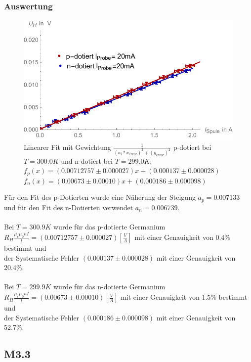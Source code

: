 \subsubsection{Auswertung}
\begin{figure}[H]
	\centering
\includegraphics[width=0.9\linewidth]{IMAGE/M32_Fit.pdf}
	\caption{Linearer Fit mit Gewichtung $\frac{1}{(a_{i}*x_{error})^2+(y_{error})^2}$ p-dotiert bei $T=300.0K$ und n-dotiert bei $T=299.0K$:\\ $f_{p}(x)=(0.00712757 \pm 0.000027)x + (0.000137 \pm 0.000028)$\\ $f_{n}(x)=(0.00673 \pm 0.00010)x + (0.000186 \pm 0.000098)$}
	\label{fig:M3_2_1}
\end{figure} 

Für den Fit  des p-Dotierten wurde eine Näherung der Steigung  $a_{p}=0.007133$  und für den Fit des n-Dotierten verwendet $a_{n}=0.006739$.\\
\\
Bei $T=300.9K$ wurde für das p-dotierte Germanium\\ $R_{H}\frac{\mu_{r} \mu_{0} n I}{l}=(0.00712757 \pm 0.000027) [\frac{V}{A}]$ mit einer Genauigkeit von 0.4\% bestimmt und\\
der Systematische Fehler $(0.000137 \pm 0.000028)$ mit einer Genauigkeit von 20.4\%.\\
\\
Bei $T=299.9K$ wurde für das n-dotierte Germanium\\ $R_{H}\frac{\mu_{r} \mu_{0} n I}{l}=(0.00673 \pm 0.00010) [\frac{V}{A}]$ mit einer Genauigkeit von 1.5\% bestimmt und\\ der Systematische Fehler $(0.000186 \pm 0.000098)$ mit einer Genauigkeit von 52.7\%.\\

\subsection{M3.3}

